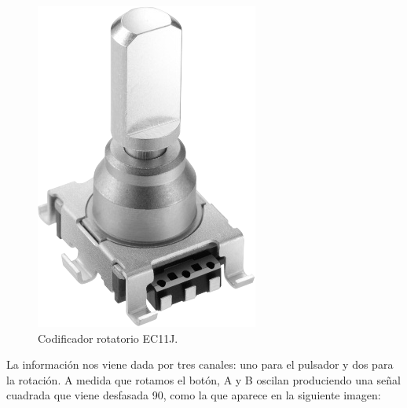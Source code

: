 \begin{figure}[H]
	\noindent \begin{centering}
		\includegraphics[width=\linewidth/4]{capitulo3/EC11J}
		\par\end{centering}
	\smallskip
	\caption{\label{fig:EC11J} Codificador rotatorio EC11J.}
\end{figure} 

\smallskip

La información nos viene dada por tres canales: uno para el pulsador y dos para la rotación. A medida que rotamos el botón, A y B oscilan produciendo una señal cuadrada que viene desfasada 90\textdegree, como la que aparece en la siguiente imagen:

\smallskip

